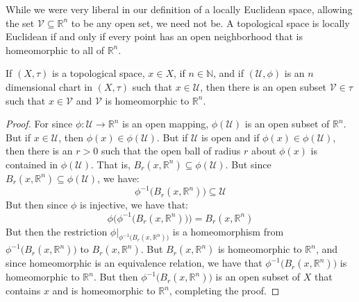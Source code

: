 \documentclass[oneside]{book}                                                  %
\begin{document}
            While we were very liberal in our definition of a locally Euclidean
            space, allowing the set $\mathcal{V}\subseteq\mathbb{R}^{n}$ to be
            any open set, we need not be. A topological space is locally
            Euclidean if and only if every point has an open neighborhood that
            is homeomorphic to all of $\mathbb{R}^{n}$.
            \begin{theorem}
                If $(X,\tau)$ is a topological space, $x\in{X}$, if
                $n\in\mathbb{N}$, and if $(\mathcal{U},\phi)$ is an $n$
                dimensional chart in $(X,\tau)$ such that $x\in\mathcal{U}$,
                then there is an open subset $\mathcal{V}\in\tau$ such that
                $x\in\mathcal{V}$ and $\mathcal{V}$ is homeomorphic to
                $\mathbb{R}^{n}$.
            \end{theorem}
            \begin{proof}
                For since $\phi:\mathcal{U}\rightarrow\mathbb{R}^{n}$ is an open
                mapping, $\phi(\mathcal{U})$ is an open subset of
                $\mathbb{R}^{n}$. But if $x\in\mathcal{U}$, then
                $\phi(x)\in\phi(\mathcal{U})$. But if $\mathcal{U}$ is open and
                if $\phi(x)\in\phi(\mathcal{U})$, then there is an $r>0$ such
                that the open ball of radius $r$ about $\phi(x)$ is contained in
                $\phi(\mathcal{U})$. That is,
                $B_{r}(x,\mathbb{R}^{n})\subseteq\phi(\mathcal{U})$.
                But since $B_{r}(x,\mathbb{R}^{n})\subseteq\phi(\mathcal{U})$,
                we have:
                \begin{equation}
                    \phi^{\minus{1}}\big(B_{r}(x,\mathbb{R}^{n})\big)
                    \subseteq\mathcal{U}
                \end{equation}
                But then since $\phi$ is injective, we have that:
                \begin{equation}
                    \phi\Big(
                        \phi^{\minus{1}}\big(B_{r}(x,\mathbb{R}^{n})\big)
                    \Big)
                    =B_{r}(x,\mathbb{R}^{n})
                \end{equation}
                But then the restriction
                $\phi|_{\phi^{\minus{1}}\big(B_{r}(x,\mathbb{R}^{n})\big)}$ is
                a homeomorphism from
                $\phi^{\minus{1}}\big(B_{r}(x,\mathbb{R}^{n})\big)$ to
                $B_{r}(x,\mathbb{R}^{n})$. But $B_{r}(x,\mathbb{R}^{n})$ is
                homeomorphic to $\mathbb{R}^{n}$, and since homeomorphic is an
                equivalence relation, we have that
                $\phi^{\minus{1}}\big(B_{r}(x,\mathbb{R}^{n})\big)$ is
                homeomorphic to $\mathbb{R}^{n}$. But then
                $\phi^{\minus{1}}\big(B_{r}(x,\mathbb{R}^{n})\big)$ is an open
                subset of $X$ that contains $x$ and is homeomorphic to
                $\mathbb{R}^{n}$, completing the proof.
            \end{proof}
\end{document}
